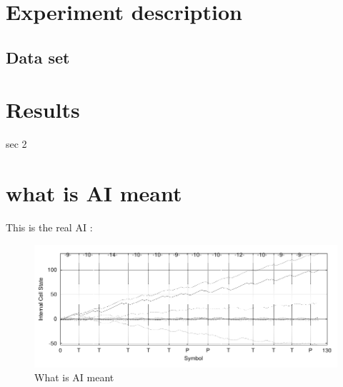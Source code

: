 \section{Experiment description}
\subsection{Data set}

\section{Results}
sec 2
\section{what is AI meant}
This is the real AI \cite{Bengio13representationlearning}: 
\begin{figure}[htbp] %
   \centering
   \includegraphics[width=\linewidth]{../images/Gers00-ForgetLSTM-fig7-internalStateDrift.png} 
   \caption{What is AI meant}
   \label{fig:ai}
\end{figure}